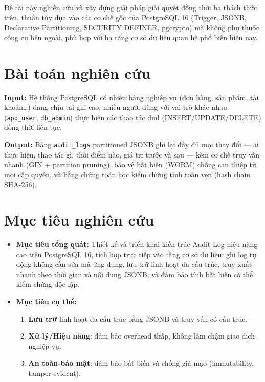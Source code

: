Đề tài này nghiên cứu và xây dựng giải pháp giải quyết đồng thời ba thách thức trên, thuần túy dựa vào các cơ chế gốc của PostgreSQL 16 (Trigger, JSONB, Declarative Partitioning, SECURITY DEFINER, pgcrypto) mà không phụ thuộc công cụ bên ngoài, phù hợp với hạ tầng cơ sở dữ liệu quan hệ phổ biến hiện nay.

\section{Bài toán nghiên cứu}

\textbf{Input:} Hệ thống PostgreSQL có nhiều bảng nghiệp vụ (đơn hàng, sản phẩm, tài khoản\ldots) đang chịu tải ghi cao; nhiều người dùng với vai trò khác nhau (\texttt{app\_user}, \texttt{db\_admin}) thực hiện các thao tác \ac{dml} (INSERT/UPDATE/DELETE) đồng thời liên tục.

\textbf{Output:} Bảng \texttt{audit\_logs} partitioned JSONB ghi lại đầy đủ mọi thay đổi --- ai thực hiện, thao tác gì, thời điểm nào, giá trị trước và sau --- kèm cơ chế truy vấn nhanh (GIN + partition pruning), bảo vệ bất biến (WORM) chống can thiệp từ mọi cấp quyền, và bằng chứng toán học kiểm chứng tính toàn vẹn (hash chain SHA-256).

\section{Mục tiêu nghiên cứu}

\begin{itemize}
    \item \textbf{Mục tiêu tổng quát:} Thiết kế và triển khai kiến trúc Audit Log hiệu năng cao trên PostgreSQL 16, tích hợp trực tiếp vào tầng cơ sở dữ liệu: ghi log tự động không cần sửa mã ứng dụng, lưu trữ linh hoạt đa cấu trúc, truy xuất nhanh theo thời gian và nội dung JSONB, và đảm bảo tính bất biến có thể kiểm chứng độc lập.
    \item \textbf{Mục tiêu cụ thể:}
    \begin{enumerate}
        \item \textbf{Lưu trữ} linh hoạt đa cấu trúc bằng JSONB và truy vấn có cấu trúc.
        \item \textbf{Xử lý/Hiệu năng}: đảm bảo overhead thấp, không làm chậm giao dịch nghiệp vụ.
        \item \textbf{An toàn-bảo mật}: đảm bảo bất biến và chống giả mạo (immutability, tamper-evident).
    \end{enumerate}
\end{itemize}

